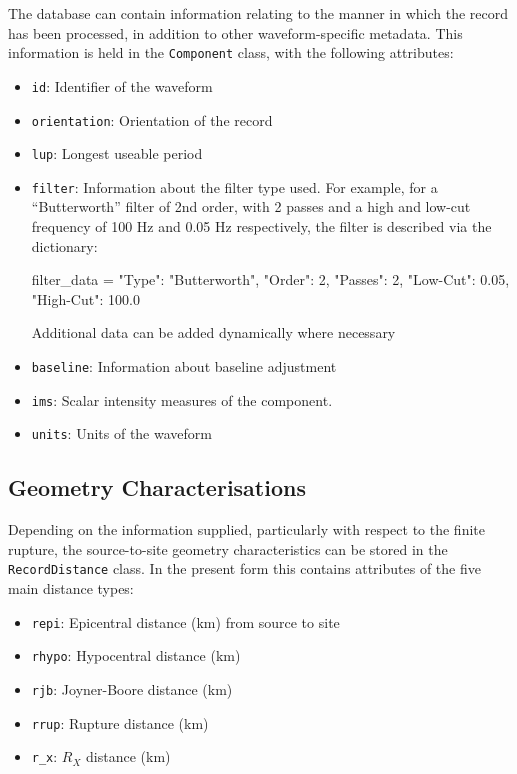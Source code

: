 The database can contain information relating to the manner in which the record has been processed, in addition to other waveform-specific metadata. This information is held in the \verb=Component= class, with the following attributes:
\begin{itemize}
\item \verb=id=: Identifier of the waveform
\item \verb=orientation=: Orientation of the record 
\item \verb=lup=: Longest useable period
\item \verb=filter=: Information about the filter type used. For example, for a ``Butterworth'' filter of 2nd order, with 2 passes and a high and low-cut frequency of 100 Hz and 0.05 Hz respectively, the filter is described via the dictionary:
\begin{python}[frame=single]
filter_data = {"Type": "Butterworth",
               "Order": 2,
               "Passes": 2,
               "Low-Cut": 0.05,
               "High-Cut": 100.0}
\end{python}
Additional data can be added dynamically where necessary
\item \verb=baseline=: Information about baseline adjustment
\item \verb=ims=: Scalar intensity measures of the component.
\item \verb=units=: Units of the waveform
\end{itemize}

\subsection{Geometry Characterisations}

Depending on the information supplied, particularly with respect to the finite rupture, the source-to-site geometry characteristics can be stored in the \verb=RecordDistance= class. In the present form this contains attributes of the five main distance types:

\begin{itemize}
\item \verb=repi=: Epicentral distance (km) from source to site
\item \verb=rhypo=: Hypocentral distance (km)
\item \verb=rjb=: Joyner-Boore distance (km)
\item \verb=rrup=: Rupture distance (km)
\item \verb=r_x=: $R_X$ distance (km)
\end{itemize}

